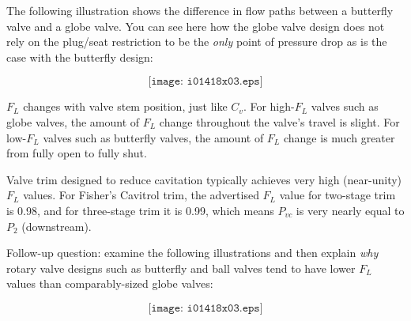 \filbreak

The following illustration shows the difference in flow paths between a butterfly valve and a globe valve.  You can see here how the globe valve design does not rely on the plug/seat restriction to be the {\it only} point of pressure drop as is the case with the butterfly design:
 
$$\texttt{[image: i01418x03.eps]}$$

\vskip 10pt

$F_L$ changes with valve stem position, just like $C_v$.  For high-$F_L$ valves such as globe valves, the amount of $F_L$ change throughout the valve's travel is slight.  For low-$F_L$ valves such as butterfly valves, the amount of $F_L$ change is much greater from fully open to fully shut.

\vskip 10pt

Valve trim designed to reduce cavitation typically achieves very high (near-unity) $F_L$ values.  For Fisher's Cavitrol trim, the advertised $F_L$ value for two-stage trim is 0.98, and for three-stage trim it is 0.99, which means $P_{vc}$ is very nearly equal to $P_2$ (downstream).

\vskip 10pt

\filbreak

Follow-up question: examine the following illustrations and then explain {\it why} rotary valve designs such as butterfly and ball valves tend to have lower $F_L$ values than comparably-sized globe valves:

$$\texttt{[image: i01418x03.eps]}$$











